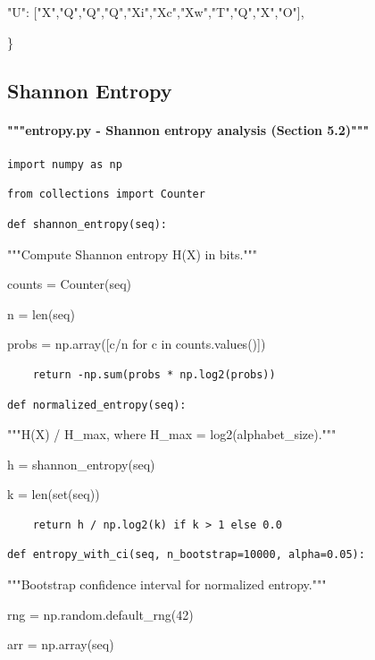 \documentclass[11pt,letterpaper]{article}
\begin{document}
        "U": ["X","Q","Q","Q","Xi","Xc","Xw","T","Q","X","O"],


    \}


\subsection{Shannon Entropy}

\paragraph{"""entropy.py - Shannon entropy analysis (Section 5.2)"""}

\begin{lstlisting}
import numpy as np
\end{lstlisting}
\begin{lstlisting}
from collections import Counter
\end{lstlisting}
\begin{lstlisting}
def shannon_entropy(seq):
\end{lstlisting}

    """Compute Shannon entropy H(X) in bits."""


    counts = Counter(seq)


    n = len(seq)


    probs = np.array([c/n for c in counts.values()])

\begin{lstlisting}
    return -np.sum(probs * np.log2(probs))
\end{lstlisting}
\begin{lstlisting}
def normalized_entropy(seq):
\end{lstlisting}

    """H(X) / H\_max, where H\_max = log2(alphabet\_size)."""


    h = shannon\_entropy(seq)


    k = len(set(seq))

\begin{lstlisting}
    return h / np.log2(k) if k > 1 else 0.0
\end{lstlisting}
\begin{lstlisting}
def entropy_with_ci(seq, n_bootstrap=10000, alpha=0.05):
\end{lstlisting}

    """Bootstrap confidence interval for normalized entropy."""


    rng = np.random.default\_rng(42)


    arr = np.array(seq)
\end{document}
